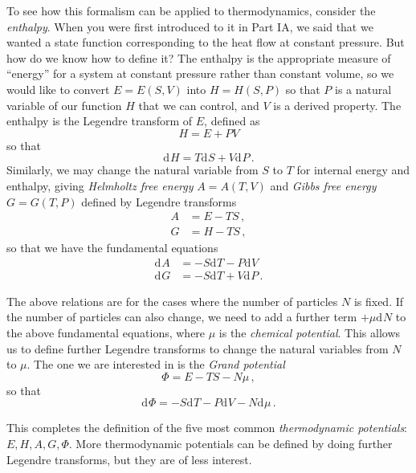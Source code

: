 \documentclass{article}
\theoremstyle{plain}\theoremheaderfont{\normalfont\bfseries}\theorembodyfont{\rmfamily}\theoremseparator{.}\newtheorem*{thm}{Theorem}\newtheorem*{law}{Law}\newtheorem*{pos}{Postulate}
\numberwithin{equation}{section}
\renewcommand{\d}[2][]{\mathrm{d}^{#1} #2}
\begin{document}
    To see how this formalism can be applied to thermodynamics, consider the \textit{enthalpy}. When you were first introduced to it in Part IA, we said that we wanted a state function corresponding to the heat flow at constant pressure. But how do we know how to define it? The enthalpy is the appropriate measure of ``energy'' for a system at constant pressure rather than constant volume, so we would like to convert \(E=E(S,V)\) into \(H=H(S, P)\) so that \(P\) is a natural variable of our function \(H\) that we can control, and \(V\) is a derived property. The enthalpy is the Legendre transform of \(E\), defined as
    \begin{equation}
        H=E+PV
    \end{equation}
    so that
    \begin{equation}
        \d{H}=T\d{S}+V\d{P}\,.
    \end{equation}
    Similarly, we may change the natural variable from \(S\) to \(T\) for internal energy and enthalpy, giving \textit{Helmholtz free energy} \(A=A(T,V)\) and \textit{Gibbs free energy} \(G=G(T,P)\) defined by Legendre transforms
    \begin{align}
        A&=E-TS\,,\\
        G&=H-TS\,,
    \end{align}
    so that we have the fundamental equations
    \begin{align}
        \d{A}&=-S\d{T}-P\d{V}\\
        \d{G}&=-S\d{T}+V\d{P}\,.
    \end{align}

    The above relations are for the cases where the number of particles \(N\) is fixed. If the number of particles can also change, we need to add a further term \(+\mu\d{N}\) to the above fundamental equations, where \(\mu\) is the \textit{chemical potential}. This allows us to define further Legendre transforms to change the natural variables from \(N\) to \(\mu\). The one we are interested in is the \textit{Grand potential}
    \begin{equation}
        \Phi=E-TS-N\mu\,,
    \end{equation}
    so that
    \begin{equation}
        \d{\Phi}=-S\d{T}-P\d{V}-N\d{\mu}\,.
    \end{equation}

    This completes the definition of the five most common \textit{thermodynamic potentials}: \(E,H,A,G,\Phi\). More thermodynamic potentials can be defined by doing further Legendre transforms, but they are of less interest.
\end{document}
